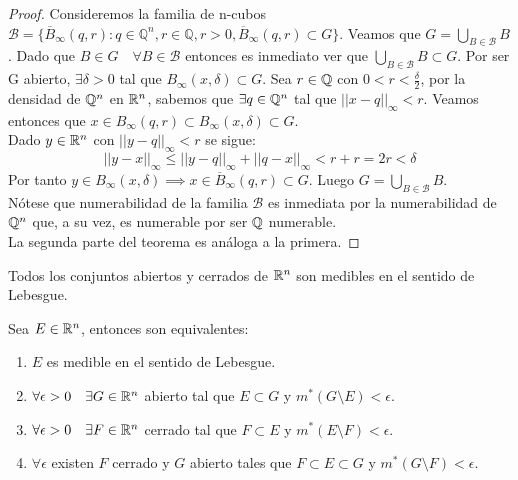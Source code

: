 \begin{proof}
    Consideremos la familia de n-cubos $\mathcal{B} = \{\overline{B}_\infty(q,r):q\in \mathbb{Q}^n, r \in \mathbb{Q}, r>0, \overline{B}_\infty(q,r) \subset G\}$. Veamos que $G = \bigcup_{B \in \mathcal{B}}B$. Dado que $B \in G \quad \forall B \in \mathcal{B}$ entonces es inmediato ver que $\bigcup_{B \in \mathcal{B}}B \subset G$. Por ser G abierto, $\exists \delta > 0$ tal que $B_{\infty}(x, \delta) \subset G$. Sea $r \in \mathbb{Q}$ con $0 < r < \frac{\delta}{2}$, por la densidad de $\mathbb{Q}^n$ en $\mathbb{R}^n$, sabemos que $\exists q \in \mathbb{Q}^n$ tal que $||x - q||_{\infty} < r$. Veamos entonces que $x \in B_{\infty}(q, r) \subset B_{\infty}(x, \delta) \subset G$.\\
    Dado $y \in \mathbb{R}^n$ con $||y - q||_{\infty} < r$ se sigue:
    \[
        ||y - x||_{\infty} \leq ||y - q||_{\infty} + ||q - x||_{\infty} < r + r = 2r < \delta
    \]
    Por tanto $y \in B_{\infty}(x, \delta) \implies x \in \overline{B}_{\infty}(q,
        r) \subset G$. Luego $G = \bigcup_{B \in \mathcal{B}}B$.\\ Nótese que
    numerabilidad de la familia $\mathcal{B}$ es inmediata por la numerabilidad de
    $\mathbb{Q}^n$ que, a su vez, es numerable por ser $\mathbb{Q}$ numerable.\\ La segunda parte
    del teorema es análoga a la primera.
\end{proof}

\begin{corolario}
    Todos los conjuntos abiertos y cerrados de $\mathbb{R}^n$ son medibles en el sentido de Lebesgue.
\end{corolario}

\begin{teorema} 
    Sea $E \in \mathbb{R}^n$, entonces son equivalentes:
    \begin{enumerate}
        \item $E$ es medible en el sentido de Lebesgue.
        \item $\forall \epsilon > 0 \quad \exists G \in \mathbb{R}^n$ abierto tal que $E \subset G$ y $m^*(G \setminus E) < \epsilon$.
        \item $\forall \epsilon > 0 \quad \exists F \in \mathbb{R}^n$ cerrado tal que $F \subset E$ y $m^*(E \setminus F) < \epsilon$.
        \item $\forall \epsilon$ existen $F$ cerrado y $G$ abierto tales que $F \subset E \subset G$ y $m^*(G \setminus F) < \epsilon$.
    \end{enumerate}
\end{teorema}

